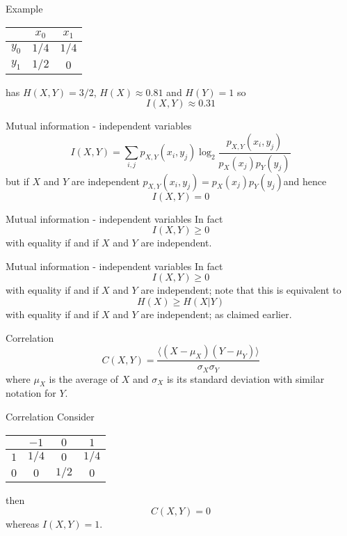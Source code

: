 \documentclass{beamer}
\newcommand{\crish}{\color{reddish}}
\newcommand{\cbla}{\color{black}}
\newcommand{\cblu}{\color{blue}}
\newcommand{\sm}{\color{reddish}$}
\newcommand{\fm}{$\color{black}{}}
\begin{document}
\begin{frame}{Example}

\begin{center}
\color{purple}
    \begin{tabular}{c|cc}
&$x_0$&$x_1$\\
\hline
$y_0$&$1/4$&$1/4$\\
$y_1$&$1/2$&$0$
    \end{tabular}
    \color{black}
\end{center}
has \sm{}H(X,Y)=3/2\fm{}, \sm{}H(X)\approx 0.81\fm{} and \sm{}H(Y)=1\fm{} so
\crish
$$
I(X,Y)\approx 0.31
$$
\cbla
\end{frame}


\begin{frame}{Mutual information - independent variables}
  \crish
  $$
  I(X,Y)=\sum_{i,j} p_{X,Y}(x_i,y_j)\log_2{\frac{p_{X,Y}(x_i,y_j)}{p_X(x_j)p_Y(y_j)}}
  $$
  \cbla
  but if \sm{}X\fm{} and \sm{}Y\fm{} are independent \sm{}p_{X,Y}(x_i,y_j)=p_X(x_j)p_Y(y_j)\fm and hence
    \crish
  $$
  I(X,Y)=0
  $$
  \cbla
\end{frame}


\begin{frame}{Mutual information - independent variables}
  In fact
  \crish
  $$
  I(X,Y)\ge 0
  $$
  \cbla
with equality if and if \sm{}X\fm{} and \sm{}Y\fm{} are independent.
\end{frame}


\begin{frame}{Mutual information - independent variables}
  In fact
    \crish
  $$
  I(X,Y)\ge 0
  $$
  \cbla
  with equality if and if \sm{}X\fm{} and \sm{}Y\fm{} are independent; note that this is equivalent to
    \crish
  $$
  H(X)\ge H(X|Y)
  $$
  \cbla
  with equality if and if \sm{}X\fm{} and \sm{}Y\fm{} are independent; as claimed earlier.
\end{frame}

\begin{frame}{Correlation}
  \crish
  $$
C(X,Y)=\frac{\langle (X-\mu_X)(Y-\mu_Y)\rangle}{\sigma_X\sigma_Y}
$$
\cbla
where \sm{}\mu_X\fm{} is the average of \sm{}X\fm{} and \sm{}\sigma_X\fm{} is its standard deviation with similar notation for \sm{}Y\fm{}.
\end{frame}

\begin{frame}{Correlation}
Consider
\begin{center}
\color{purple}
\begin{tabular}{c|ccc}
&$-1$&$0$&$1$\\
\hline
$1$&$1/4$&$0$  &$1/4$\\
$0$&$0$  &$1/2$&$0$
    \end{tabular}
    \color{black}
\end{center}
then
\crish
$$
C(X,Y)=0
$$
\cbla
whereas \cblu$I(X,Y)=1$\cbla.
\end{frame}
\end{document}
